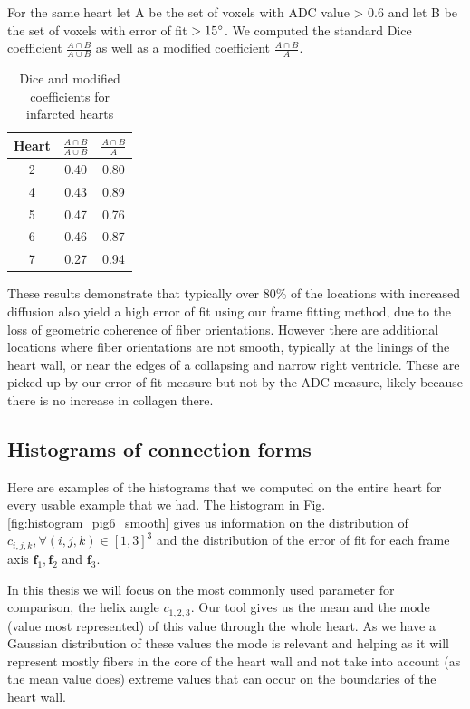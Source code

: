 For the same heart let A be the set of voxels with ADC value > 0.6 and let B be the set of voxels with error of fit $> 15 ^{\circ}$. We computed the standard Dice coefficient $\frac{A \cap B}{A \cup B}$ as well as a modified coefficient $\frac{A \cap B}{A}$.
\begin{table}
    \centering
    \begin{tabular}{|c | c | c |}
         \hline
         Heart & $\frac{A \cap B}{A \cup B}$ & $\frac{A \cap B}{A}$ \\
         \hline
         2 & 0.40 & 0.80 \\ 
         \hline
         4 & 0.43 & 0.89 \\
         \hline
         5 & 0.47 & 0.76 \\
         \hline
         6 & 0.46 & 0.87 \\
         \hline
         7 & 0.27 & 0.94 \\ 
         \hline
    \end{tabular}
    \caption{Dice and modified coefficients for infarcted hearts}
\end{table}

These results demonstrate that typically over 80\% of the locations with increased diffusion also yield a high error of fit using our frame fitting method, due to the loss of geometric coherence of fiber orientations. However there are additional locations where fiber orientations are not smooth, typically at the linings of the heart wall, or near the edges of a collapsing and narrow right ventricle. These are picked up by our error of fit measure but not by the ADC measure, likely because there is no increase in collagen there.

\subsection{Histograms of connection forms} \label{histogram_section}

Here are examples of the histograms that we computed on the entire heart for every usable example that we had. The histogram in Fig. \ref{fig:histogram_pig6_smooth} gives us information on the distribution of $c_{i,j,k}, \forall (i, j, k) \in [1, 3]^3$ and the distribution of the error of fit for each frame axis $\mathbf{f}_1, \mathbf{f}_2$ and $\mathbf{f}_3$.

In this thesis we will focus on the most commonly used parameter for comparison, the helix angle $c_{1,2,3}$. Our tool gives us the mean and the mode (value most represented) of this value through the whole heart. As we have a Gaussian distribution of these values the mode is relevant and helping as it will represent mostly fibers in the core of the heart wall and not take into account (as the mean value does) extreme values that can occur on the boundaries of the heart wall.

